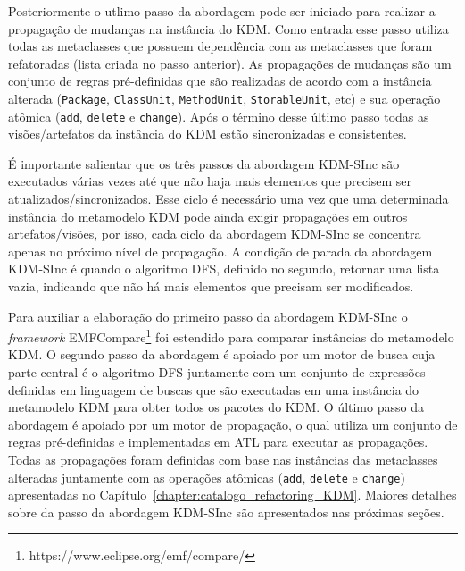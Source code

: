 Posteriormente o utlimo passo da abordagem pode ser iniciado para realizar a propagação de mudanças na instância do KDM. Como entrada esse passo utiliza todas as metaclasses que possuem dependência com as metaclasses que foram refatoradas (lista criada no passo anterior). As propagações de mudanças são um conjunto de regras pré-definidas que são realizadas de acordo com a instância alterada (\texttt{Package}, \texttt{ClassUnit}, \texttt{MethodUnit}, \texttt{StorableUnit}, etc) e sua operação atômica (\texttt{add}, \texttt{delete} e \texttt{change}). Após o término desse último passo todas as visões/artefatos da instância do KDM estão sincronizadas e consistentes.

É importante salientar que os três passos da abordagem KDM-SInc são executados várias vezes até que não haja mais elementos que precisem ser atualizados/sincronizados. Esse ciclo é necessário uma vez que uma determinada instância do metamodelo KDM pode ainda exigir propagações em outros artefatos/visões, por isso, cada ciclo da abordagem KDM-SInc se concentra apenas no próximo nível de propagação. A condição de parada da abordagem KDM-SInc é quando o algoritmo DFS, definido no segundo, retornar uma lista vazia, indicando que não há mais elementos que precisam ser modificados.



Para auxiliar a elaboração do primeiro passo da abordagem KDM-SInc o \textit{framework} EMFCompare\footnote{https://www.eclipse.org/emf/compare/} foi estendido para comparar instâncias do metamodelo KDM. O segundo passo da abordagem é apoiado por um motor de busca cuja parte central é o algoritmo DFS juntamente com um conjunto de expressões definidas em linguagem de buscas que são executadas em uma instância do metamodelo KDM para obter todos os pacotes do KDM. O último passo da abordagem é apoiado por um motor de propagação, o qual utiliza um conjunto de regras pré-definidas e implementadas em ATL para executar as propagações. Todas as propagações foram definidas com base nas instâncias das metaclasses alteradas juntamente com as operações atômicas (\texttt{add}, \texttt{delete} e \texttt{change}) apresentadas no Capítulo~\ref{chapter:catalogo_refactoring_KDM}. Maiores detalhes sobre da passo da abordagem KDM-SInc são apresentados nas próximas seções. %

